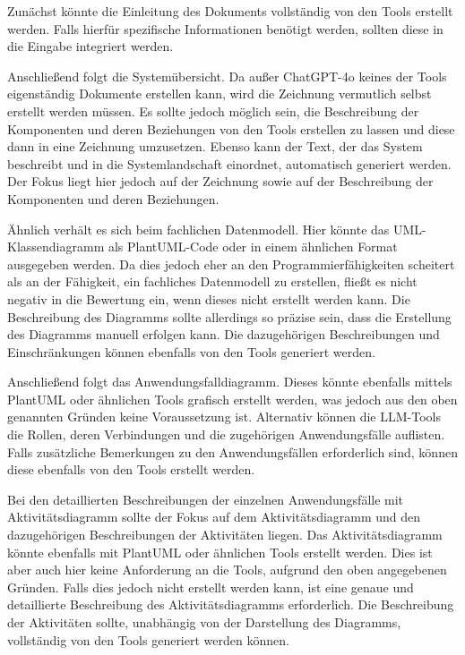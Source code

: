 Zunächst könnte die Einleitung des Dokuments vollständig von den Tools erstellt werden. Falls hierfür spezifische 
Informationen benötigt werden, sollten diese in die Eingabe integriert werden.

Anschließend folgt die Systemübersicht. Da außer ChatGPT-4o keines der Tools eigenständig Dokumente erstellen kann, 
wird die Zeichnung vermutlich selbst erstellt werden müssen. Es sollte jedoch möglich sein, die Beschreibung der 
Komponenten und deren Beziehungen von den Tools erstellen zu lassen und diese dann in eine Zeichnung umzusetzen. 
Ebenso kann der Text, der das System beschreibt und in die Systemlandschaft einordnet, automatisch generiert werden. 
Der Fokus liegt hier jedoch auf der Zeichnung sowie auf der Beschreibung der Komponenten und deren Beziehungen.

Ähnlich verhält es sich beim fachlichen Datenmodell. Hier könnte das UML-Klassendiagramm als PlantUML-Code oder 
in einem ähnlichen Format ausgegeben werden. Da dies jedoch eher an den Programmierfähigkeiten scheitert als an 
der Fähigkeit, ein fachliches Datenmodell zu erstellen, fließt es nicht negativ in die Bewertung ein, wenn dieses 
nicht erstellt werden kann. Die Beschreibung des Diagramms sollte allerdings so präzise sein, dass die Erstellung 
des Diagramms manuell erfolgen kann. Die dazugehörigen Beschreibungen und Einschränkungen können ebenfalls von den 
Tools generiert werden.

Anschließend folgt das Anwendungsfalldiagramm. Dieses könnte ebenfalls mittels PlantUML oder ähnlichen Tools 
grafisch erstellt werden, was jedoch aus den oben genannten Gründen keine Voraussetzung ist. Alternativ können 
die LLM-Tools die Rollen, deren Verbindungen und die zugehörigen Anwendungsfälle auflisten. Falls zusätzliche 
Bemerkungen zu den Anwendungsfällen erforderlich sind, können diese ebenfalls von den Tools erstellt werden.

Bei den detaillierten Beschreibungen der einzelnen Anwendungsfälle mit Aktivitätsdiagramm sollte der Fokus auf 
dem Aktivitätsdiagramm und den dazugehörigen Beschreibungen der Aktivitäten liegen. Das Aktivitätsdiagramm 
könnte ebenfalls mit PlantUML oder ähnlichen Tools erstellt werden. Dies ist aber auch hier keine Anforderung an 
die Tools, aufgrund den oben angegebenen Gründen. Falls dies jedoch nicht erstellt werden kann, ist eine genaue 
und detaillierte Beschreibung des Aktivitätsdiagramms erforderlich. Die Beschreibung der Aktivitäten 
sollte, unabhängig von der Darstellung des Diagramms, vollständig von den Tools generiert werden können.

